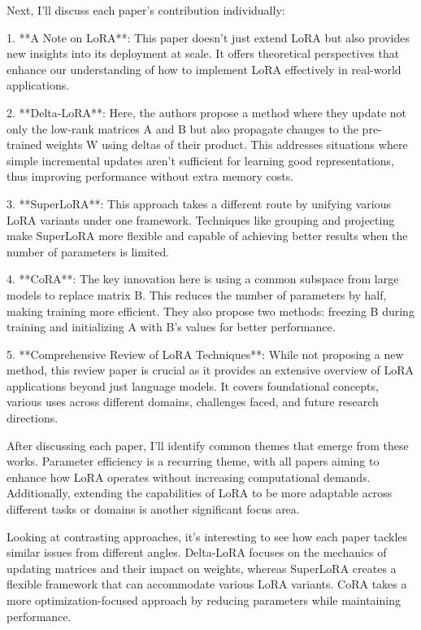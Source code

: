 \documentclass[conference]{IEEEtran}
\begin{document}
Next, I'll discuss each paper's contribution individually:

1. **A Note on LoRA**: This paper doesn't just extend LoRA but also provides new insights into its deployment at scale. It offers theoretical perspectives that enhance our understanding of how to implement LoRA effectively in real-world applications.

2. **Delta-LoRA**: Here, the authors propose a method where they update not only the low-rank matrices A and B but also propagate changes to the pre-trained weights W using deltas of their product. This addresses situations where simple incremental updates aren't sufficient for learning good representations, thus improving performance without extra memory costs.

3. **SuperLoRA**: This approach takes a different route by unifying various LoRA variants under one framework. Techniques like grouping and projecting make SuperLoRA more flexible and capable of achieving better results when the number of parameters is limited.

4. **CoRA**: The key innovation here is using a common subspace from large models to replace matrix B. This reduces the number of parameters by half, making training more efficient. They also propose two methods: freezing B during training and initializing A with B's values for better performance.

5. **Comprehensive Review of LoRA Techniques**: While not proposing a new method, this review paper is crucial as it provides an extensive overview of LoRA applications beyond just language models. It covers foundational concepts, various uses across different domains, challenges faced, and future research directions.

After discussing each paper, I'll identify common themes that emerge from these works. Parameter efficiency is a recurring theme, with all papers aiming to enhance how LoRA operates without increasing computational demands. Additionally, extending the capabilities of LoRA to be more adaptable across different tasks or domains is another significant focus area.

Looking at contrasting approaches, it's interesting to see how each paper tackles similar issues from different angles. Delta-LoRA focuses on the mechanics of updating matrices and their impact on weights, whereas SuperLoRA creates a flexible framework that can accommodate various LoRA variants. CoRA takes a more optimization-focused approach by reducing parameters while maintaining performance.
\end{document}
